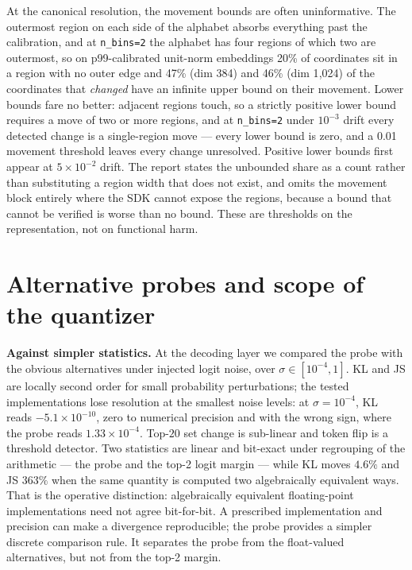\documentclass{article}
\begin{document}
At the canonical resolution, the movement bounds are often uninformative. The outermost region on each side of the alphabet absorbs everything past the calibration, and at \texttt{n\_bins=2} the alphabet has four regions of which two are outermost, so on p99-calibrated unit-norm embeddings 20\% of coordinates sit in a region with no outer edge and 47\% (dim 384) and 46\% (dim 1{,}024) of the coordinates that \emph{changed} have an infinite upper bound on their movement. Lower bounds fare no better: adjacent regions touch, so a strictly positive lower bound requires a move of two or more regions, and at \texttt{n\_bins=2} under $10^{-3}$ drift every detected change is a single-region move --- every lower bound is zero, and a 0.01 movement threshold leaves every change unresolved. Positive lower bounds first appear at $5\times10^{-2}$ drift. The report states the unbounded share as a count rather than substituting a region width that does not exist, and omits the movement block entirely where the SDK cannot expose the regions, because a bound that cannot be verified is worse than no bound. These are thresholds on the representation, not on functional harm.

\section{Alternative probes and scope of the quantizer}\label{app:adversarial}

\textbf{Against simpler statistics.} At the decoding layer we compared the probe with the obvious alternatives under injected logit noise, over $\sigma\in[10^{-4},1]$. KL and JS are locally second order for small probability perturbations; the tested implementations lose resolution at the smallest noise levels: at $\sigma=10^{-4}$, KL reads $-5.1\times10^{-10}$, zero to numerical precision and with the wrong sign, where the probe reads $1.33\times10^{-4}$. Top-$20$ set change is sub-linear and token flip is a threshold detector. Two statistics are linear and bit-exact under regrouping of the arithmetic --- the probe and the top-2 logit margin --- while KL moves $4.6\%$ and JS $363\%$ when the same quantity is computed two algebraically equivalent ways. That is the operative distinction: algebraically equivalent floating-point implementations need not agree bit-for-bit. A prescribed implementation and precision can make a divergence reproducible; the probe provides a simpler discrete comparison rule. It separates the probe from the float-valued alternatives, but not from the top-2 margin.
\end{document}
